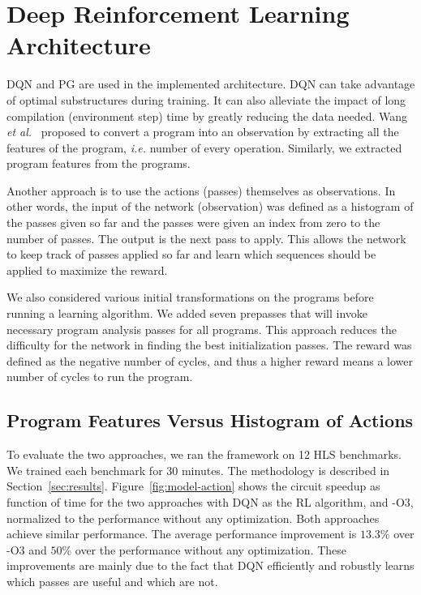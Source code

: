 \section{Deep Reinforcement Learning Architecture} %
\label{sec:DRLA}
DQN and PG are used in the implemented architecture.
DQN can take advantage of optimal substructures during training. It can also alleviate the impact of long compilation (environment step) time by greatly reducing the data needed. Wang \textit{et al.}~\cite{wang2018} proposed to convert a program into an observation by extracting all the features of the program, \textit{i.e.} number of every operation. Similarly, we extracted program features from the programs. %

Another approach is to use the actions (passes) themselves as observations. In other words, the input of the network (observation) was defined as a histogram of the passes given so far and the passes were given an index from zero to the number of passes. The output is the next pass to apply. This allows the network to keep track of passes applied so far and learn which sequences should be applied to maximize the reward.

We also considered various initial transformations on the programs before running a learning algorithm. We added seven prepasses that will invoke necessary program analysis passes for all programs. This approach reduces the difficulty for the network in finding the best initialization passes. The reward was defined as the negative number of cycles, and thus a higher reward means a lower number of cycles to run the program.

\subsection{Program Features Versus Histogram of Actions}
To evaluate the two approaches, we ran the framework on 12 HLS benchmarks. We trained each benchmark for $30$ minutes. The methodology is described in Section~\ref{sec:results}. Figure~\ref{fig:model-action} shows the circuit speedup as function of time for the two approaches with DQN as the RL algorithm, and -O3, normalized to the performance without any optimization. Both approaches achieve similar performance. The average performance improvement is $13.3\%$ over -O3 and $50\%$ over the performance without any optimization. These improvements are mainly due to the fact that DQN efficiently and robustly learns which passes are useful and which are not.

